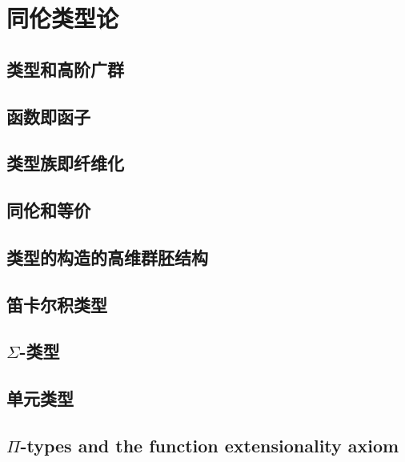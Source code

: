 \chapter{同伦类型论}
\label{cha:basics}


\section{类型和高阶广群}
\label{sec:equality}


\section{函数即函子}
\label{sec:functors}


\section{类型族即纤维化}
\label{sec:fibrations}


\section{同伦和等价}
\label{sec:basics-equivalences}


\section{类型的构造的高维群胚结构}
\label{sec:computational}


\section{笛卡尔积类型}
\label{sec:compute-cartprod}


\section{\texorpdfstring{$\Sigma$}{Σ}-类型}
\label{sec:compute-sigma}


\section{单元类型}
\label{sec:compute-unit}


\section{\texorpdfstring{$\Pi$}{Π}-types and the function extensionality axiom}
\label{sec:compute-pi}


